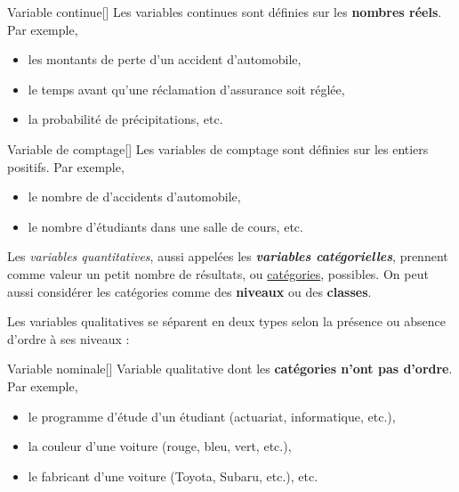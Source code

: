 \documentclass[french]{article}
\begin{document}
\begin{multicols*}{2}
\begin{definitionNOHFILLsub}
\begin{definitionGENERAL}{Variable continue}[]
Les variables continues sont définies sur les \textbf{nombres réels}. Par exemple, 
\begin{itemize}
	\item	les montants de perte d'un accident d'automobile, 
	\item	le temps avant qu'une réclamation d'assurance soit réglée, 
	\item	la probabilité de précipitations, etc.
\end{itemize}
\end{definitionGENERAL}

\begin{definitionGENERAL}{Variable de comptage}[]
Les variables de comptage sont définies sur les entiers positifs. Par exemple,
\begin{itemize}
	\item	le nombre de d'accidents d'automobile, 
	\item	le nombre d'étudiants dans une salle de cours, etc.
\end{itemize}
\end{definitionGENERAL}

\end{definitionNOHFILLsub}

\begin{definitionNOHFILLsub}
Les \textit{variables quantitatives}, aussi appelées les \textbf{\textit{variables catégorielles}}, prennent comme valeur un petit nombre de résultats, ou \underline{catégories}, possibles. On peut aussi considérer les catégories comme des \textbf{niveaux} ou des \textbf{classes}.

\bigskip

Les variables qualitatives se séparent en deux types selon la présence ou absence d'ordre à ses niveaux : 

\begin{definitionGENERAL}{\hypertarget{nominalVariable}{Variable nominale}}[]
Variable qualitative dont les \textbf{catégories n'ont pas d'ordre}. Par exemple, 
\begin{itemize}
	\item	le programme d'étude d'un étudiant (actuariat, informatique, etc.), 
	\item	la couleur d'une voiture (rouge, bleu, vert, etc.), 
	\item	le fabricant d'une voiture (Toyota, Subaru, etc.), etc.
\end{itemize}
\end{definitionGENERAL}


\end{definitionNOHFILLsub}
\end{multicols*}
\end{document}
